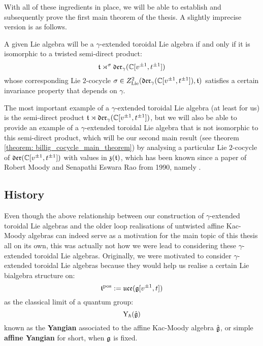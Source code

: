         With all of these ingredients in place, we will be able to establish and subsequently prove the first main theorem of the thesis. A slightly imprecise version is as follows.
        \begin{theorem}
            A given Lie algebra will be a $\gamma$-extended toroidal Lie algebra if and only if it is isomorphic to a twisted semi-direct product:
                $$\mathfrak{t} \rtimes^{\sigma} \mathfrak{der}_{\gamma}(\mathbb{C}[v^{\pm 1}, t^{\pm 1}])$$
            whose corresponding Lie $2$-cocycle $\sigma \in Z^2_{\mathrm{Lie}}(\mathfrak{der}_{\gamma}(\mathbb{C}[v^{\pm 1}, t^{\pm 1}]), \mathfrak{t})$ satisfies a certain invariance property that depends on $\gamma$.
        \end{theorem}

        The most important example of a $\gamma$-extended toroidal Lie algebra (at least for us) is the semi-direct product $\mathfrak{t} \rtimes \mathfrak{der}_{\gamma}(\mathbb{C}[v^{\pm 1}, t^{\pm 1}])$, but we will also be able to provide an example of a $\gamma$-extended toroidal Lie algebra that is not isomorphic to this semi-direct product, which will be our second main result (see theorem \ref{theorem: billig_cocycle_main_theorem}) by analysing a particular Lie $2$-cocycle of $\mathfrak{der}(\mathbb{C}[v^{\pm 1}, t^{\pm 1}])$ with values in $\mathfrak{z}(\mathfrak{t})$, which has been known since a paper of Robert Moody and Senapathi Eswara Rao from 1990, namely \cite{moody_rao_n_toroidal_vertex_representations}.

    \subsection{History} \label{subsection: history}
        Even though the above relationship between our construction of $\gamma$-extended toroidal Lie algebras and the older loop realisations of untwisted affine Kac-Moody algebras can indeed serve as a motivation for the main topic of this thesis all on its own, this was actually not how we were lead to considering these $\gamma$-extended toroidal Lie algebras. Originally, we were motivated to consider $\gamma$-extended toroidal Lie algebras because they would help us realise a certain Lie bialgebra structure on:
            $$\mathfrak{t}^{\mathrm{pos}} := \mathfrak{uce}(\mathfrak{g}[v^{\pm 1}, t])$$
        as the classical limit of a quantum group:
            $$\mathrm{Y}_{\hbar}(\hat{\mathfrak{g}})$$
        known as the \textbf{Yangian} associated to the affine Kac-Moody algebra $\hat{\mathfrak{g}}$, or simple  \textbf{affine Yangian} for short, when $\mathfrak{g}$ is fixed.
        
